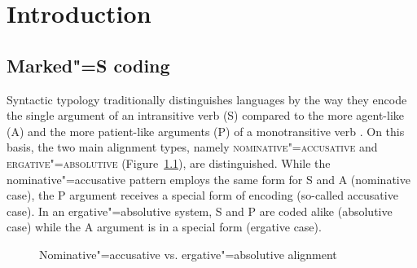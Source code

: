 \chapter{Introduction}\label{introduction}


\section{Marked"=S coding}\label{coding}

Syntactic typology traditionally distinguishes languages by the way they encode the single argument of an intransitive verb (S) compared to the more agent-like (A) and the more patient-like arguments (P) of a monotransitive verb \citep{Comrie:1978,Dixon:1979,Dixon:2010-1}. 
On this basis, the two main alignment types, namely \textsc{nominative"=accusative} and \textsc{ergative"=absolutive} (Figure~\ref{Alignment}), are dis\-tin\-guish\-ed. 
While  the nominative"=accusative pattern employs the same form for S and A (nominative case), the P argument receives a special form of encoding (so-called accusative case).  
In an ergative"=absolutive system,  S and P are coded alike (absolutive case) while the A argument is in a special form (ergative case).

\begin{figure}[h] \centering {}

\caption{Nominative"=accusative vs. ergative"=absolutive alignment}\label{Alignment} \end{figure} 

